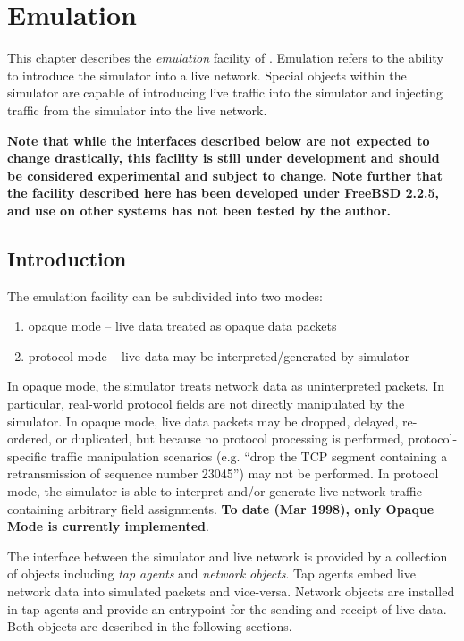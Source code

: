 \chapter{Emulation}
\label{sec:emulation}

This chapter describes the {\em emulation} facility
of \ns.
Emulation refers to the ability to introduce the
simulator into a live network.
Special objects within the simulator are capable
of introducing live traffic into the simulator and
injecting traffic from the simulator into the
live network.

{\bf Note that while the interfaces described below
are not expected to change drastically,
this facility is still under development and
should be considered experimental and subject to change.
Note further that the facility described here has been
developed under FreeBSD 2.2.5, and use on other systems
has not been tested by the author.
}

\section{Introduction}

The emulation facility can be subdivided into
two modes:
\begin{enumerate}
\item {\sf opaque mode} -- live data treated as opaque data packets
\item {\sf protocol mode} -- live data may be interpreted/generated by simulator
\end{enumerate}
In opaque mode, the simulator
treats network data as uninterpreted packets.
In particular, real-world protocol fields
are not directly manipulated by the simulator.
In opaque mode, live data packets may be dropped, delayed, re-ordered, or
duplicated, but because no protocol processing is performed,
protocol-specific traffic manipulation scenarios (e.g. ``drop the TCP segment
containing a retransmission of sequence number 23045'') may not be performed.
In protocol mode, the simulator is able to interpret and/or generate
live network traffic containing arbitrary field assignments.
{\bf To date (Mar 1998), only Opaque Mode is currently implemented}.

The interface between the simulator and live network is provided by
a collection of objects including {\em tap agents} and {\em network objects}.
Tap agents embed live network data into simulated packets and
vice-versa.
Network objects are installed in tap agents and provide an entrypoint
for the sending and receipt of live data.
Both objects are described in the following sections.

